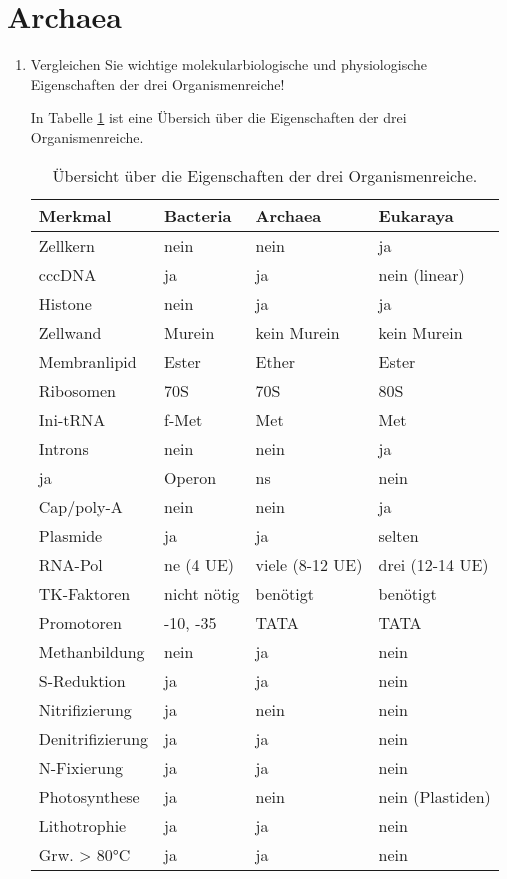 \section{Archaea}
\begin{enumerate}
	\item Vergleichen Sie wichtige molekularbiologische und physiologische Eigenschaften der drei Organismenreiche!
		
		In Tabelle \ref{tab:domains} ist eine Übersich über die Eigenschaften der drei Organismenreiche.	

		\begin{table}[h!]
		\begin{center}
		\begin{tabular}{l l l l} 
		\toprule
		Merkmal		&	Bacteria		&	 Archaea				&	 Eukaraya		\\
		\midrule
		Zellkern 	&	nein			&	 nein					&	 ja		\\
		cccDNA		&	ja				&	 ja					&	 nein (linear)			\\
		Histone		&	nein			&	 ja					&	 ja		\\
		Zellwand		&	Murein		&	 kein Murein		&	 kein Murein		\\
		Membranlipid&	Ester			&	 Ether				&	 Ester		\\
		\midrule
		Ribosomen	&	70S			&	 70S					&	 80S		\\
		Ini-tRNA		&	f-Met			&	 Met					&	 Met		\\
		Introns 		&	nein			&	 nein					&	 ja		\\
		ja				&	Operon		&	 ns					&	 nein		\\
		Cap/poly-A 	&	nein			&	 nein					&	 ja		\\
		Plasmide		&	ja				&	 ja					&	 selten		\\
		RNA-Pol			&	ne (4 UE)	&	 viele (8-12 UE)	&	drei (12-14 UE)	\\
		TK-Faktoren		&	nicht nötig	&	 benötigt			&	benötigt		\\
		Promotoren		&	-10, -35		&	 TATA					&	TATA		\\
		\midrule
		Methanbildung		&	nein			&	 ja					&	nein		\\
		S-Reduktion		&	ja				&	 ja					&	nein		\\
		Nitrifizierung	&	ja				&	 nein					&	nein		\\
		Denitrifizierung		&	ja				&	 ja					&	nein		\\
		N-Fixierung		&	ja				&	 ja					&	nein		\\
		Photosynthese		&	ja				&	 nein					&	nein (Plastiden)	\\
		Lithotrophie	&	ja				&	 ja					&	nein		\\
		Grw. > 80°C		&	ja				&	 ja					&	nein		\\
		\bottomrule
		\end{tabular}
		\label{tab:domains}
		\caption{Übersicht über die Eigenschaften der drei Organismenreiche.}
		\end{center}
		\end{table}


\end{enumerate}
